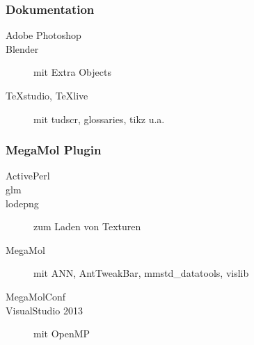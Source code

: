 \subsubsection{Dokumentation}
\begin{description}
	\item [Adobe Photoshop]
	\item [Blender] mit Extra Objects
	\item [TeXstudio, TeXlive] mit tudscr, glossaries, tikz u.a.
\end{description}

\subsubsection{MegaMol Plugin}
\begin{description}
	\item [ActivePerl]
	\item [glm]
	\item [lodepng] zum Laden von Texturen
	\item [MegaMol] mit ANN, AntTweakBar, mmstd\_datatools, vislib
	\item [MegaMolConf]
	\item [VisualStudio 2013] mit OpenMP
\end{description}


\printbibliography[heading=bibintoc]\label{sec:bibliography}

\printindex %

